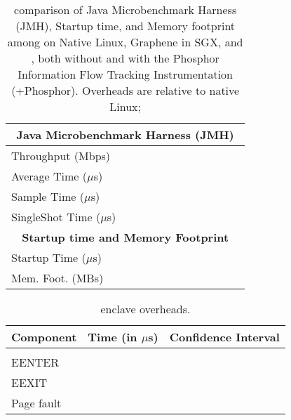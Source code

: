 \begin{table}[t!b!]
\begin{tabular}{|l|rr|rrr|rrr|rrr|}
				\hline
				\multicolumn{12}{|c|}{{\bf Java Microbenchmark Harness (JMH)}}\\
				\hline
				Throughput (Mbps)&  &  &  &  &  &  &  &  &  &  &  \\
				Average Time (\footnotesize $\mu$s)&  &  &  &  &  &  &  &  &  &  &  \\
				Sample Time (\footnotesize $\mu$s)&  &  &  &  &  &  &  &  &  &  &  \\
				SingleShot Time (\footnotesize $\mu$s)&  &  &  &  &  &  &  &  &  &  &  \\				
				\hline
				\multicolumn{12}{|c|}{{\bf Startup time and Memory Footprint}}\\
				\hline
				Startup Time (\footnotesize $\mu$s)&  &  &  &  &  &  &  &  &  &  &  \\
				Mem. Foot. (MBs)&  &  &  &  &  &  &  &  &  &  &  \\
				\hline
%
			\end{tabular}
			\caption{comparison of Java Microbenchmark Harness (JMH), Startup time, and Memory footprint
			among \java{} on Native Linux, Graphene in SGX, and \systemname{}, both without and with the Phosphor Information Flow Tracking Instrumentation (+Phosphor).
				Overheads are relative to native Linux; 
			}
			\label{tab:perf}
		\end{table}


\begin{table}[t!b!]
	\footnotesize
	\centering
	\begin{tabular}{lrr}
		\hline
		{\bf Component} & {\bf Time (in \footnotesize $\mu$s)} & {\bf Confidence Interval}\\
		\hline\\
		EENTER &  &  \\
		EEXIT &  &  \\
		Page fault &  &  \\
		\hline
	\end{tabular}
	\caption{\sgx{} enclave overheads.}
	\label{tab:sgx}
\end{table}

